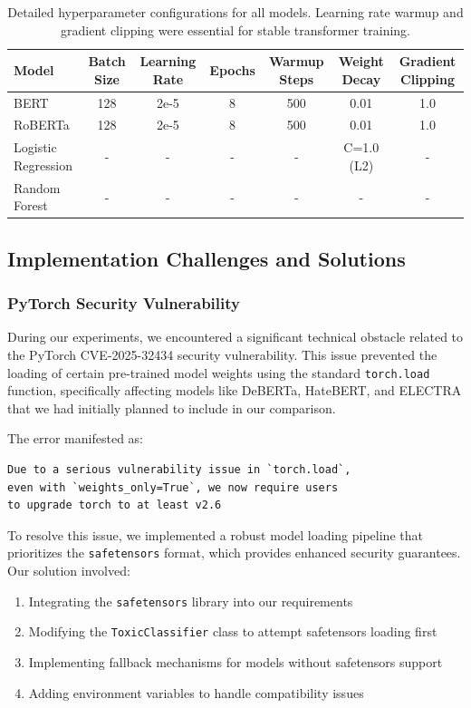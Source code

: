 \documentclass[11pt]{article}
\begin{document}
\begin{table}[ht]
\centering
\small
\begin{tabular}{lcccccc}
\toprule
\textbf{Model} & \textbf{Batch Size} & \textbf{Learning Rate} & \textbf{Epochs} & \textbf{Warmup Steps} & \textbf{Weight Decay} & \textbf{Gradient Clipping} \\
\midrule
BERT & 128 & 2e-5 & 8 & 500 & 0.01 & 1.0 \\
RoBERTa & 128 & 2e-5 & 8 & 500 & 0.01 & 1.0 \\
Logistic Regression & - & - & - & - & C=1.0 (L2) & - \\
Random Forest & - & - & - & - & - & - \\
\bottomrule
\end{tabular}
\caption{Detailed hyperparameter configurations for all models. Learning rate warmup and gradient clipping were essential for stable transformer training.}
\label{tab:hyperparams_detailed}
\end{table}

\subsection{Implementation Challenges and Solutions}

\subsubsection{PyTorch Security Vulnerability}

During our experiments, we encountered a significant technical obstacle related to the PyTorch CVE-2025-32434 security vulnerability. This issue prevented the loading of certain pre-trained model weights using the standard \texttt{torch.load} function, specifically affecting models like DeBERTa, HateBERT, and ELECTRA that we had initially planned to include in our comparison.

The error manifested as:
\begin{verbatim}
Due to a serious vulnerability issue in `torch.load`, 
even with `weights_only=True`, we now require users 
to upgrade torch to at least v2.6
\end{verbatim}

To resolve this issue, we implemented a robust model loading pipeline that prioritizes the \texttt{safetensors} format, which provides enhanced security guarantees. Our solution involved:

\begin{enumerate}
    \item Integrating the \texttt{safetensors} library into our requirements
    \item Modifying the \texttt{ToxicClassifier} class to attempt safetensors loading first
    \item Implementing fallback mechanisms for models without safetensors support
    \item Adding environment variables to handle compatibility issues
\end{enumerate}
\end{document}
